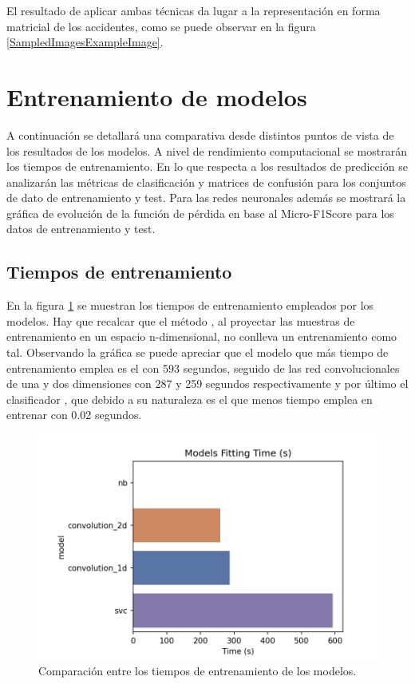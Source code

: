   El resultado de aplicar ambas técnicas da lugar a la representación en forma matricial de los accidentes, como se puede observar en la figura \ref{SampledImagesExampleImage}.



\section{Entrenamiento de modelos}

  A continuación se detallará una comparativa desde distintos puntos de vista de los resultados de los modelos. A nivel de rendimiento computacional se mostrarán los tiempos de entrenamiento. En lo que respecta a los resultados de predicción se analizarán las métricas de clasificación y matrices de confusión para los conjuntos de dato de entrenamiento y test. Para las redes neuronales además se mostrará la gráfica de evolución de la función de pérdida en base al Micro-F1Score para los datos de entrenamiento y test.

  \subsection{Tiempos de entrenamiento}

    En la figura \ref{TiemposEntrenamientoImage} se muestran los tiempos de entrenamiento empleados por los modelos. Hay que recalcar que el método , al proyectar las muestras de entrenamiento en un espacio n-dimensional, no conlleva un entrenamiento como tal. Observando la gráfica se puede apreciar que el modelo que más tiempo de entrenamiento emplea es el  con 593 segundos, seguido de las red convolucionales de una y dos dimensiones con 287 y 259 segundos respectivamente y por último el clasificador , que debido a su naturaleza es el que menos tiempo emplea en entrenar con 0.02 segundos. 


    \begin{figure}[h]
      \centering
      \includegraphics[width=12cm]{archivos/5.Resultados/TiemposEntrenamiento}
      \caption{Comparación entre los tiempos de entrenamiento de los modelos.}
      \label{TiemposEntrenamientoImage}
    \end{figure}


